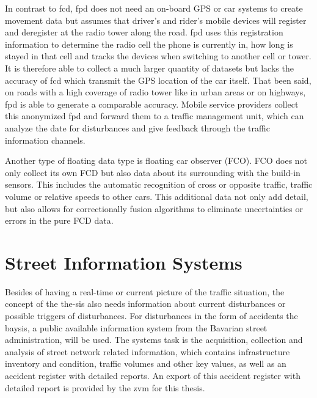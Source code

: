 \documentclass[a4paper,12pt]{report}
\begin{document}
\par In contrast to \acrshort{fcd}, \acrlong{fpd} does not need an on-board GPS or car systems to create movement data but assumes that driver’s and rider’s mobile devices will register and deregister at the radio tower along the road. \acrshort{fpd} uses this registration information to determine the radio cell the phone is currently in, how long is stayed in that cell and tracks the devices when switching to another cell or tower. It is therefore able to collect a much larger quantity of datasets but lacks the accuracy of \acrshort{fcd} which transmit the GPS location of the car itself. That been said, on roads with a high coverage of radio tower like in urban areas or on highways, \acrshort{fpd} is able to generate a comparable accuracy. Mobile service providers collect this anonymized \acrshort{fpd} and forward them to a traffic management unit, which can analyze the date for disturbances and give feedback through the traffic information channels.\cite{Randelhoff2016,LAPID2020}

\par Another type of floating data type is floating car observer (FCO). FCO does not only collect its own FCD but also data about its surrounding with the build-in sensors. This includes the automatic recognition of cross or opposite traffic, traffic volume or relative speeds to other cars. This additional data not only add detail, but also allows for correctionally fusion algorithms to eliminate uncertainties or errors in the pure FCD data. \cite{Randelhoff2016}

\section{Street Information Systems}

\par Besides of having a real-time or current picture of the traffic situation, the concept of the the-sis also needs information about current disturbances or possible triggers of disturbances. For disturbances in the form of accidents the \acrfull{baysis}, a public available information system from the Bavarian street administration, will be used. The systems task is the acquisition, collection and analysis of street network related information, which contains infrastructure inventory and condition, traffic volumes and other key values, as well as an accident register with detailed reports. An export of this accident register with detailed report is provided by the \acrshort{zvm} for this thesis.
\end{document}
